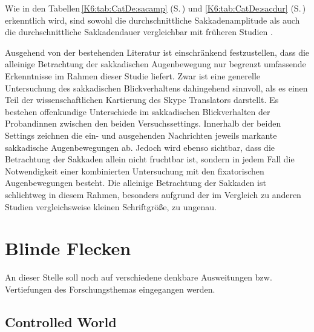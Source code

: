 Wie in den Tabellen\,\ref{K6:tab:CatDe:sacamp} (S.\,\pageref{K6:tab:CatDe:sacamp}) und \ref{K6:tab:CatDe:sacdur} (S.\,\pageref{K6:tab:CatDe:sacdur}) erkenntlich wird, sind sowohl die durchschnittliche Sakkadenamplitude als auch die durchschnittliche Sakkadendauer vergleichbar mit früheren Studien \citep[]{rayner_eye_1998, gangl_lexical_2018, nikolova_binocular_2018}.

Ausgehend von der bestehenden Literatur \citep[]{beatty_task-evoked_1982} ist einschränkend festzustellen, dass die alleinige Betrachtung der sakkadischen Augenbewegung nur begrenzt umfassende Erkenntnisse im Rahmen dieser Studie liefert. Zwar ist eine generelle Untersuchung des sakkadischen Blickverhaltens dahingehend sinnvoll, als es einen Teil der wissenschaftlichen Kartierung des Skype Translators darstellt. Es bestehen offenkundige Unterschiede im sakkadischen Blickverhalten der Proband{\textperiodcentered}innen zwischen den beiden Versuchssettings. Innerhalb der beiden Settings zeichnen die ein- und ausgehenden Nachrichten jeweils markante sakkadische Augenbewegungen ab. Jedoch wird ebenso sichtbar, dass die Betrachtung der Sakkaden allein nicht fruchtbar ist, sondern in jedem Fall die Notwendigkeit einer kombinierten Untersuchung mit den fixatorischen Augenbewegungen besteht. Die alleinige Betrachtung der Sakkaden ist schlichtweg in diesem Rahmen, besonders aufgrund der im Vergleich zu anderen Studien vergleichsweise kleinen Schriftgröße, zu ungenau.


\section{Blinde Flecken}
\label{K7:sec:BlindeFlecke}



An dieser Stelle soll noch auf verschiedene denkbare Ausweitungen bzw. Vertiefungen des Forschungsthemas eingegangen werden. 

\subsection{Controlled World}\label{K7:para:controlled-world}

